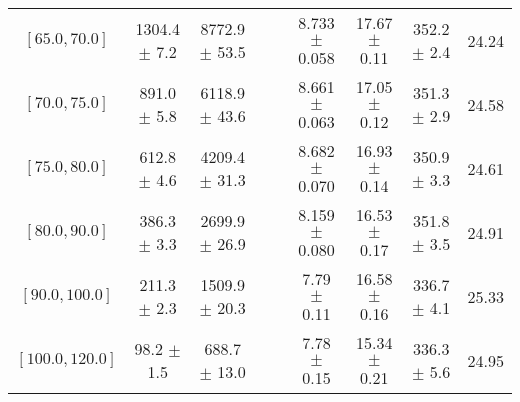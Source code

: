\begin{tabular}{c||c|c|c|c|c|c|c||c}
$[65.0, 70.0]$ & 1304.4 $\pm$ 7.2 & 8772.9 $\pm$ 53.5 &  &  & 8.733 $\pm$ 0.058 & 17.67 $\pm$ 0.11 & 352.2 $\pm$ 2.4 & 24.24\\
$[70.0, 75.0]$ & 891.0 $\pm$ 5.8 & 6118.9 $\pm$ 43.6 &  &  & 8.661 $\pm$ 0.063 & 17.05 $\pm$ 0.12 & 351.3 $\pm$ 2.9 & 24.58\\
$[75.0, 80.0]$ & 612.8 $\pm$ 4.6 & 4209.4 $\pm$ 31.3 &  &  & 8.682 $\pm$ 0.070 & 16.93 $\pm$ 0.14 & 350.9 $\pm$ 3.3 & 24.61\\
$[80.0, 90.0]$ & 386.3 $\pm$ 3.3 & 2699.9 $\pm$ 26.9 &  &  & 8.159 $\pm$ 0.080 & 16.53 $\pm$ 0.17 & 351.8 $\pm$ 3.5 & 24.91\\
$[90.0, 100.0]$ & 211.3 $\pm$ 2.3 & 1509.9 $\pm$ 20.3 &  &  & 7.79 $\pm$ 0.11 & 16.58 $\pm$ 0.16 & 336.7 $\pm$ 4.1 & 25.33\\
$[100.0, 120.0]$ & 98.2 $\pm$ 1.5 & 688.7 $\pm$ 13.0 &  &  & 7.78 $\pm$ 0.15 & 15.34 $\pm$ 0.21 & 336.3 $\pm$ 5.6 & 24.95\\
\end{tabular}
